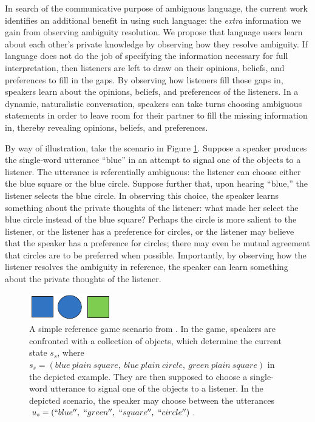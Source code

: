 \documentclass[10pt,a4paper]{article}
\begin{document}
In search of the communicative purpose of ambiguous language, the current work identifies an additional benefit in using such language: the \emph{extra} information we gain from observing ambiguity resolution.
We propose that language users learn about each other's private knowledge by observing how they resolve ambiguity. If language does not do the job of specifying the information necessary for full interpretation, then listeners are left to draw on their opinions, beliefs, and preferences to fill in the gaps. By observing how listeners fill those gaps in, speakers learn about the opinions, beliefs, and preferences of the listeners.
In a dynamic, naturalistic conversation, speakers can take turns choosing ambiguous statements in order to leave room for their partner to fill the missing information in, thereby revealing opinions, beliefs, and preferences. 


By way of illustration, take the scenario in Figure \ref{FG-ref-game}.
Suppose a speaker produces the single-word utterance ``blue'' in an attempt to signal one of the objects to a listener. The utterance is referentially ambiguous: the listener can choose either the blue square or the blue circle. Suppose further that, upon hearing ``blue,'' the listener selects the blue circle. In observing this choice, the speaker learns something about the private thoughts of the listener: what made her select the blue circle instead of the blue square? Perhaps the circle is more salient to the listener, or the listener has a preference for circles, or the listener may believe that the speaker has a preference for circles; there may even be mutual agreement that circles are to be preferred when possible. Importantly, by observing how the listener resolves the ambiguity in reference, the speaker can learn something about the private thoughts of the listener. 

\begin{figure}
	\centering
	\includegraphics[width=.5\linewidth]{images/rsascene-eps-converted-to.pdf}
	\caption{A simple reference game scenario from \protect{}.
		In the game, speakers are confronted with a collection of objects, which determine the current state $s_s$, where $s_s=(blue\ plain\ square,\ blue\ plain\ circle,\ green\ plain\ square)$ in the depicted example. 
		They are then supposed to choose a single-word utterance to signal one of the objects to a listener.
		In the depicted scenario, the speaker may choose between the utterances $u_s=(``blue'',\ ``green'',\ ``square'',\ ``circle'')$.}
	\label{FG-ref-game}
\end{figure}
\end{document}
